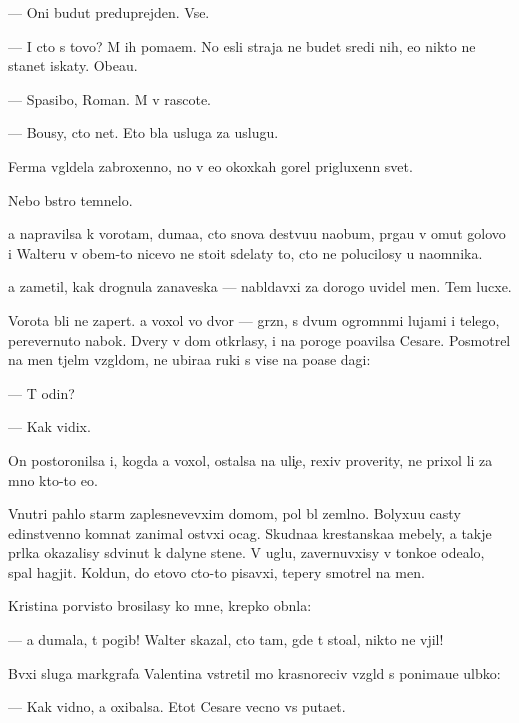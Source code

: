 \documentclass[10pt]{book}
\begin{document}
— Oni budut preduprejden{\yi}. Vse.

— I cto s tovo? M{\yi} ih po{\y}ma{\y}em. No {\y}esli straja ne budet sredi nih, {\y}e{\y}o nikto ne stanet iskaty. Obe{\x}a{\y}u.

— Spasibo, Roman. M{\yi} v rascote.

— Bo{\y}usy, cto net. Eto b{\yi}la usluga za uslugu.



Ferma v{\yi}gl{\ia}dela zabroxenno{\y}, no v {\y}e{\y}o okoxkah gorel prigluxenn{\yi}{\y} svet.

Nebo b{\yi}stro temnelo.

{\Y}a napravilsa k vorotam, duma{\y}a, cto snova de{\y}stvu{\y}u naobum, pr{\yi}ga{\y}u v omut golovo{\y} i Walteru v ob{\x}em-to nicevo ne sto{\y}it sdelaty to, cto ne polucilosy u na{\y}omnika.

{\Y}a zametil, kak drognula zanaveska — nabl{\iu}davxi{\y} za dorogo{\y} uvidel men{\ia}. Tem lucxe.

Vorota b{\yi}li ne zapert{\yi}. {\Y}a  voxol vo dvor — gr{\ia}zn{\yi}{\y}, s dvum{\ia} ogromn{\yi}mi lujami i telego{\y}, perevernuto{\y} nabok. Dvery v dom otkr{\yi}lasy, i na poroge po{\y}avilsa Cesare. Posmotrel na men{\ia} t{\ia}jel{\yi}m vzgl{\ia}dom, ne ubira{\y}a ruki s vis{\ia}{\x}e{\y} na po{\y}ase dagi:

— T{\yi} odin?

— Kak vidix.

On postoronilsa i, kogda {\y}a  voxol, ostalsa na uli{\c}e, rexiv proverity, ne prixol li za mno{\y} kto-to {\y}e{\x}o.

Vnutri pahlo star{\yi}m zaplesnevevxim domom, pol b{\yi}l zeml{\ia}no{\y}. Bolyxu{\y}u casty {\y}edinstvenno{\y} komnat{\yi} zanimal ost{\yi}vxi{\y} ocag. Skudna{\y}a krest{\y}anska{\y}a mebely, a takje pr{\ia}lka okazalisy sdvinut{\yi} k dalyne{\y} stene. V uglu, zavernuvxisy v tonko{\y}e ode{\y}alo, spal hagjit. Koldun, do etovo cto-to pisavxi{\y}, tepery smotrel na men{\ia}.

Kristina por{\yi}visto brosilasy ko mne, krepko obn{\ia}la:

— {\Y}a dumala, t{\yi} pogib! Walter skazal, cto tam, gde t{\yi} sto{\y}al, nikto ne v{\yi}jil!

B{\yi}vxi{\y} sluga markgrafa Valentina vstretil mo{\y} krasnoreciv{\yi}{\y} vzgl{\ia}d s ponima{\y}u{\x}e{\y} ul{\yi}bko{\y}:

— Kak vidno, {\y}a oxibalsa. Etot Cesare vecno vs{\e} puta{\y}et.
\end{document}
